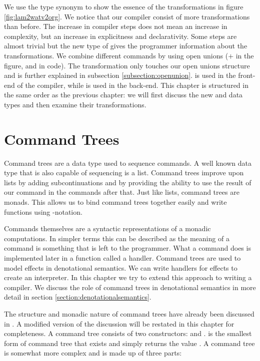 We use the type synonym  to show the essence of the transformations in figure \ref{fig:lam2watv2org}. We notice that our compiler consist of more transformations than before. The increase in compiler steps does not mean an increase in complexity, but an increase in explicitness and declarativity. Some steps are almost trivial but the new type of  gives the programmer information about the transformations. We combine different commands by using open unions ($+$ in the figure, and \icode{:+:} in code). The  transformation only touches our open unions structure and is further explained in subsection \ref{subsection:openunion}.  is used in the front-end of the compiler, while  is used in the back-end. This chapter is structured in the same order as the previous chapter: we will first discuss the new  and  data types and then examine their transformations.

\section{\label{section:commandtree}Command Trees}
Command trees are a data type used to sequence commands. A well known data type that is also capable of sequencing is a list. Command trees improve upon lists by adding subcontinuations and by providing the ability to use the result of our command in the commands after that. Just like lists, command trees are monads. This allows us to bind command trees together easily and write functions using -notation.

Commands themselves are a syntactic representations of a monadic computations. In simpler terms this can be described as the meaning of a command is something that is left to the programmer. What a command does is implemented later in a function called a handler. Command trees are used to model effects in denotational semantics. We can write handlers for effects to create an interpreter. In this chapter we try to extend this approach to writing a compiler. We discuss the role of command trees in denotational semantics in more detail in section \ref{section:denotationalsemantics}.

The structure and monadic nature of command trees have already been discussed in  \autocite{commandtreespoulsen}. A modified version of the discussion will be restated in this chapter for completeness. A command tree consists of two constructors:  and .  is the smallest form of command tree that exists and simply returns the value . A  command tree is somewhat more complex and is made up of three parts:

